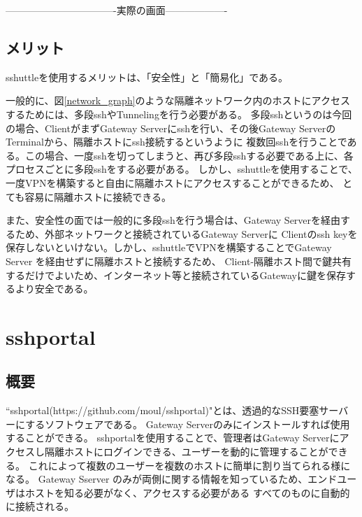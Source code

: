 \documentclass[12pt,a4paper,titlepage]{jreport}
\begin{document}
----------------------------------実際の画面-------------------



\subsection*{メリット}
sshuttleを使用するメリットは、「安全性」と「簡易化」である。\par
一般的に、図\ref{network_graph}のような隔離ネットワーク内のホストにアクセスするためには、多段sshやTunnelingを行う必要がある。
多段sshというのは今回の場合、ClientがまずGateway Serverにsshを行い、その後Gateway ServerのTerminalから、隔離ホストにssh接続するというように
複数回sshを行うことである。この場合、一度sshを切ってしまうと、再び多段sshする必要である上に、各プロセスごとに多段sshをする必要がある。
しかし、sshuttleを使用することで、一度VPNを構築すると自由に隔離ホストにアクセスすることができるため、
とても容易に隔離ホストに接続できる。\par
また、安全性の面では一般的に多段sshを行う場合は、Gateway Serverを経由するため、外部ネットワークと接続されているGateway Serverに
Clientのssh keyを保存しないといけない。しかし、sshuttleでVPNを構築することでGateway Server を経由せずに隔離ホストと接続するため、
Client-隔離ホスト間で鍵共有するだけでよいため、インターネット等と接続されているGatewayに鍵を保存するより安全である。


\section{sshportal}

\subsection*{概要}
``sshportal(https://github.com/moul/sshportal)"とは、透過的なSSH要塞サーバーにするソフトウェアである。
Gateway Serverのみにインストールすれば使用することができる。
sshportalを使用することで、管理者はGateway Serverにアクセスし隔離ホストにログインできる、ユーザーを動的に管理することができる。
これによって複数のユーザーを複数のホストに簡単に割り当てられる様になる。
Gateway Sserver のみが両側に関する情報を知っているため、エンドユーザはホストを知る必要がなく、アクセスする必要がある
すべてのものに自動的に接続される。
\end{document}
